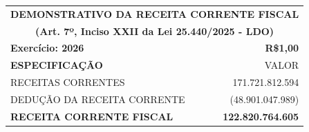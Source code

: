 \documentclass{article}
\begin{document}

\pagestyle{empty}

\renewcommand*{\arraystretch}{1.9}\footnotesize\color{myblack}\centering\noindent\begin{longtable}[c]{m{15cm}m{5cm}}\multicolumn{2}{c}{\cellcolor{gray!50} \textcolor{myblack} {\small \textbf{DEMONSTRATIVO DA RECEITA CORRENTE FISCAL}}} \\\multicolumn{2}{c}{\cellcolor{gray!50} \textcolor{myblack} {\footnotesize \textbf{(Art. 7º, Inciso XXII da Lei 25.440/2025 - LDO)}}}  \\\multicolumn{1}{l}{\textbf{Exercício:  2026 }} & \multicolumn{1}{r}{\textbf{R\$1,00}} \\\hline\hline\multicolumn{1}{l}{\textbf{ ESPECIFICAÇÃO}} & \multicolumn{1}{r}{VALOR} \\\hline\hline\multicolumn{1}{L{15cm}}{ RECEITAS CORRENTES } & \multicolumn{1}{r}{ 171.721.812.594 } \\
\multicolumn{1}{L{15cm}}{ DEDUÇÃO DA RECEITA CORRENTE } & \multicolumn{1}{r}{ (48.901.047.989) } \\
\hline\hline\hline
\multicolumn{1}{L{15cm}}{ \textbf{ RECEITA CORRENTE FISCAL }} & \multicolumn{1}{r}{ \textbf{ 122.820.764.605 }} \\
\hline\hline\hline\end{longtable}\raggedright\fontsize{7pt}{10pt}\selectfont {FONTE: Armazém SISOR.}\\\fontsize{7pt}{10pt}\selectfont {ELABORAÇÃO: DCAF/SCPPO/SEPLAG}\\
\end{document}
